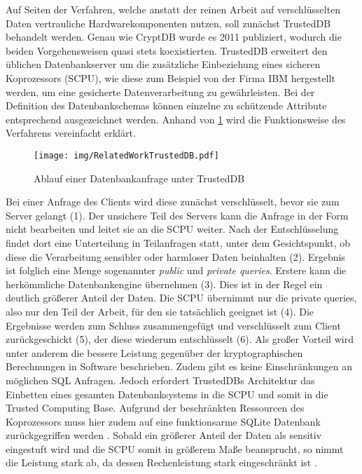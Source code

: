 Auf Seiten der Verfahren, welche anstatt der reinen Arbeit auf verschlüsselten Daten vertrauliche Hardwarekomponenten nutzen, soll zunächst TrustedDB \cite{Bajaj2013} behandelt werden. Genau wie CryptDB wurde es 2011 publiziert, wodurch die beiden Vorgehensweisen quasi stets koexistierten. TrustedDB erweitert den üblichen Datenbankserver um die zusätzliche Einbeziehung eines sicheren Koprozessors (SCPU), wie diese zum Beispiel von der Firma IBM hergestellt werden, um eine gesicherte Datenverarbeitung zu gewährleisten. Bei der Definition des Datenbankschemas können einzelne zu schützende Attribute entsprechend ausgezeichnet werden. Anhand von \ref{fig:trusteddb} wird die Funktionsweise des Verfahrens vereinfacht erklärt. 

\begin{figure}[h]
	\texttt{[image: img/RelatedWorkTrustedDB.pdf]}
	\centering
	\caption{Ablauf einer Datenbankanfrage unter TrustedDB}
	\label{fig:trusteddb}
\end{figure}

Bei einer Anfrage des Clients wird diese zunächst verschlüsselt, bevor sie zum Server gelangt (1). Der unsichere Teil des Servers kann die Anfrage in der Form nicht bearbeiten und leitet sie an die SCPU weiter. Nach der Entschlüsselung findet dort eine Unterteilung in Teilanfragen statt, unter dem Gesichtspunkt, ob diese die Verarbeitung sensibler oder harmloser Daten beinhalten (2). Ergebnis ist folglich eine Menge sogenannter \textit{public} und \textit{private queries}. Erstere kann die herkömmliche Datenbankengine übernehmen (3). Dies ist in der Regel ein deutlich größerer Anteil der Daten. Die SCPU übernimmt nur die private queries, also nur den Teil der Arbeit, für den sie tatsächlich geeignet ist (4). Die Ergebnisse werden zum Schluss zusammengefügt und verschlüsselt zum Client zurückgeschickt (5), der diese wiederum entschlüsselt (6). Als großer Vorteil wird unter anderem die bessere Leistung gegenüber der kryptographischen Berechnungen in Software beschrieben. Zudem gibt es keine Einschränkungen an möglichen SQL Anfragen. Jedoch erfordert TrustedDBs Architektur das Einbetten eines gesamten Datenbanksystems in die SCPU und somit in die Trusted Computing Base. Aufgrund der beschränkten Ressourcen des Koprozessors muss hier zudem auf eine funktionsarme SQLite Datenbank zurückgegriffen werden \cite{Arasu}. Sobald ein größerer Anteil der Daten als sensitiv eingestuft wird und die SCPU somit in größerem Maße beansprucht, so nimmt die Leistung stark ab, da dessen Rechenleistung stark eingeschränkt ist \cite{Arasu2012}.

